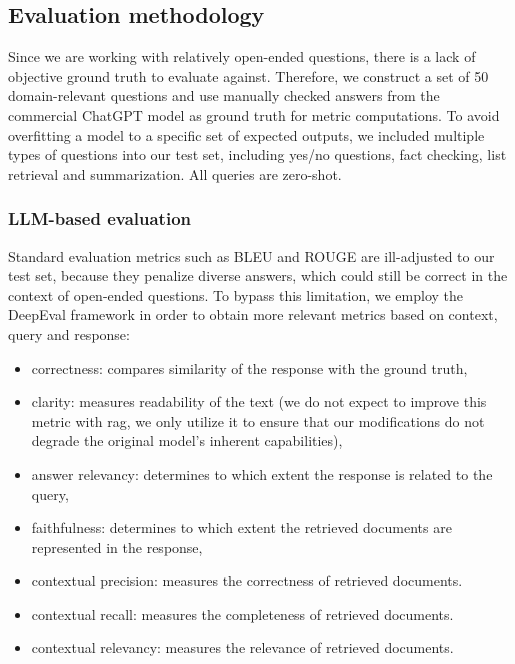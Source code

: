 \documentclass[fleqn,moreauthors,10pt]{ds_report}
\begin{document}
\subsection*{Evaluation methodology}

Since we are working with relatively open-ended questions, there is a lack of objective ground truth to evaluate against. Therefore, we construct a set of 50 domain-relevant questions and use manually checked answers from the commercial ChatGPT model as ground truth for metric computations. To avoid overfitting a model to a specific set of expected outputs, we included multiple types of questions into our test set, including yes/no questions, fact checking, list retrieval and summarization. All queries are zero-shot.


\subsubsection*{LLM-based evaluation}

Standard evaluation metrics such as BLEU and ROUGE are ill-adjusted to our test set, because they penalize diverse answers, which could still be correct in the context of open-ended questions. To bypass this limitation, we employ the DeepEval framework \cite{deepeval} in order to obtain more relevant metrics based on context, query and response:

\begin{itemize}
	\item correctness: compares similarity of the response with the ground truth,
	\item clarity: measures readability of the text (we do not expect to improve this metric with \ac{rag}, we only utilize it to ensure that our modifications do not degrade the original model's inherent capabilities),
	\item answer relevancy: determines to which extent the response is related to the query,
	\item faithfulness: determines to which extent the retrieved documents are represented in the response,
	\item contextual precision: measures the correctness of retrieved documents.
	\item contextual recall: measures the completeness of retrieved documents.
	\item contextual relevancy: measures the relevance of retrieved documents.
\end{itemize} 
\end{document}
